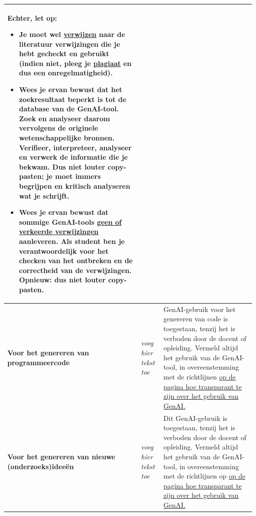 \begin{longtable}{|p{}|p{}|p{}|}
\medskip
\textbf{Echter, let op: }
\begin{itemize}
    \item Je \textbf{moet} wel \href{https://bib.kuleuven.be/training-en-tutorials/citeren/basisprincipes}{verwijzen} naar de \textbf{literatuur verwijzingen} die je hebt gecheckt en gebruikt (indien niet, pleeg je \href{https://www.kuleuven.be/onderwijs/plagiaat/index}{plagiaat} en dus een onregelmatigheid).
    \item Wees je ervan bewust dat het zoekresultaat beperkt is tot de database van de GenAI-tool. Zoek en analyseer daarom vervolgens de \textbf{originele wetenschappelijke bronnen}. Verifieer, interpreteer, analyseer en verwerk de informatie die je bekwam. Dus niet louter copy-pasten; je moet immers begrijpen en kritisch analyseren wat je schrijft.
    \item Wees je ervan bewust dat sommige GenAI-tools \href{https://www.kuleuven.be/onderwijs/learninglab/ondersteuning/genai/richtlijnen-veilig-gebruik-ai-tools}{geen of verkeerde verwijzingen} aanleveren. Als student ben je verantwoordelijk voor het checken van het ontbreken en de correctheid van de verwijzingen. Opnieuw: dus niet louter copy-pasten.
\end{itemize} \\ \hline
\textbf{Voor het genereren van programmeercode} & \textit{voeg hier tekst toe} & GenAI-gebruik voor het genereren van code is toegestaan, tenzij het is verboden door de docent of opleiding. Vermeld altijd het gebruik van de GenAI-tool, in overeenstemming met de richtlijnen \href{https://www.kuleuven.be/onderwijs/student/onderwijstools/artificiele-intelligentie#Transparantie}{op de pagina hoe transparant te zijn over het gebruik van GenAI.}
\\ \hline
\textbf{Voor het genereren van nieuwe (onderzoeks)ideeën} & \textit{voeg hier tekst toe} & Dit GenAI-gebruik is toegestaan, tenzij het is verboden door de docent of opleiding. Vermeld altijd het gebruik van de GenAI-tool, in overeenstemming met de richtlijnen op \href{https://www.kuleuven.be/onderwijs/student/onderwijstools/artificiele-intelligentie#Transparantie}{op de pagina hoe transparant te zijn over het gebruik van GenAI.}


\end{longtable}
